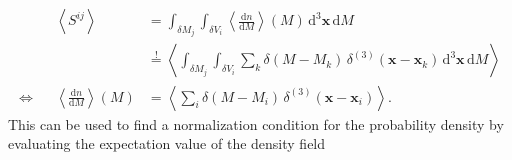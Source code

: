 \documentclass[oneside]{book}
\newcommand*{\rd}{\mathrm{d}}
\begin{document}
\begin{align}
    &&\left\langle S^{ij} \right\rangle &= \int_{\delta M_j} \int_{\delta V_i}  \left\langle \frac{\rd n}{\rd M} \right \rangle(M) \, \rd^3 \boldsymbol{x} \, \rd M \\
    && &\overset{!}{=}  \left\langle \int_{\delta M_j} \int_{\delta V_i} \sum_k \delta(M-M_k)\,\delta^{(3)}(\boldsymbol{x}-\boldsymbol{x}_k)   \, \rd^3 \boldsymbol{x} \, \rd M \right\rangle  \\
    \Longleftrightarrow && \left\langle \frac{\rd n}{\rd M} \right \rangle(M) &= \left\langle \sum_i \delta(M-M_i)\,\delta^{(3)}(\boldsymbol{x}-\boldsymbol{x}_i)  \right \rangle.
\end{align}
This can be used to find a normalization condition for the probability density by evaluating the expectation value of the density field 
\end{document}
